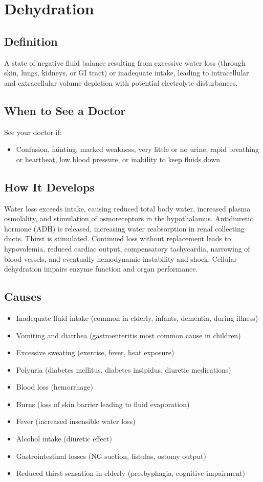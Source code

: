 \chapter{Dehydration}

\section*{Definition}
A state of negative fluid balance resulting from excessive water loss (through skin, lungs, kidneys, or GI tract) or inadequate intake, leading to intracellular and extracellular volume depletion with potential electrolyte disturbances.

\section*{When to See a Doctor}
See your doctor if:
\begin{itemize}
  \item Confusion, fainting, marked weakness, very little or no urine, rapid breathing or heartbeat, low blood pressure, or inability to keep fluids down
\end{itemize}

\section*{How It Develops}
Water loss exceeds intake, causing reduced total body water, increased plasma osmolality, and stimulation of osmoreceptors in the hypothalamus. Antidiuretic hormone (ADH) is released, increasing water reabsorption in renal collecting ducts. Thirst is stimulated. Continued loss without replacement leads to hypovolemia, reduced cardiac output, compensatory tachycardia, narrowing of blood vessels, and eventually hemodynamic instability and shock. Cellular dehydration impairs enzyme function and organ performance.

\section*{Causes}
\begin{itemize}
  \item Inadequate fluid intake (common in elderly, infants, dementia, during illness)
  \item Vomiting and diarrhea (gastroenteritis most common cause in children)
  \item Excessive sweating (exercise, fever, heat exposure)
  \item Polyuria (diabetes mellitus, diabetes insipidus, diuretic medications)
  \item Blood loss (hemorrhage)
  \item Burns (loss of skin barrier leading to fluid evaporation)
  \item Fever (increased insensible water loss)
  \item Alcohol intake (diuretic effect)
  \item Gastrointestinal losses (NG suction, fistulas, ostomy output)
  \item Reduced thirst sensation in elderly (presbyphagia, cognitive impairment)
\end{itemize}

